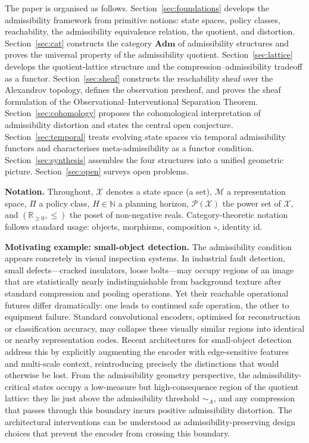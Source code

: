 \documentclass[11pt, a4paper]{article}
\theoremstyle{plain}
\theoremstyle{definition}
\theoremstyle{remark}
\newcommand{\R}{\mathbb{R}}
\newcommand{\N}{\mathbb{N}}
\newcommand{\calX}{\mathcal{X}}
\newcommand{\calM}{\mathcal{M}}
\newcommand{\calP}{\mathcal{P}}
\newcommand{\simA}{\sim_{\!A}}
\newcommand{\Adm}{\mathbf{Adm}}
\newcommand{\id}{\mathrm{id}}
\begin{document}
The paper is organised as follows. Section~\ref{sec:foundations} develops
the admissibility framework from primitive notions: state spaces, policy
classes, reachability, the admissibility equivalence relation, the quotient,
and distortion. Section~\ref{sec:cat} constructs the category $\Adm$ of
admissibility structures and proves the universal property of the admissibility
quotient. Section~\ref{sec:lattice} develops the quotient-lattice structure
and the compression--admissibility tradeoff as a functor.
Section~\ref{sec:sheaf} constructs the reachability sheaf over the Alexandrov
topology, defines the observation presheaf, and proves the sheaf formulation
of the Observational--Interventional Separation Theorem.
Section~\ref{sec:cohomology} proposes the cohomological interpretation of
admissibility distortion and states the central open conjecture.
Section~\ref{sec:temporal} treats evolving state spaces via temporal
admissibility functors and characterises meta-admissibility as a functor
condition. Section~\ref{sec:synthesis} assembles the four structures into a
unified geometric picture. Section~\ref{sec:open} surveys open problems.

\medskip
\noindent\textbf{Notation.} Throughout, $\calX$ denotes a state space (a set),
$\calM$ a representation space, $\Pi$ a policy class, $H \in \N$ a planning
horizon, $\calP(\calX)$ the power set of $\calX$, and $(\R_{\geq 0}, \leq)$
the poset of non-negative reals. Category-theoretic notation follows standard
usage: objects, morphisms, composition $\circ$, identity $\id$.

\medskip
\noindent\textbf{Motivating example: small-object detection.}
The admissibility condition appears concretely in visual inspection systems.
In industrial fault detection, small defects---cracked insulators, loose
bolts---may occupy regions of an image that are statistically nearly
indistinguishable from background texture after standard compression and
pooling operations. Yet their reachable operational futures differ dramatically:
one leads to continued safe operation, the other to equipment failure. Standard
convolutional encoders, optimised for reconstruction or classification accuracy,
may collapse these visually similar regions into identical or nearby
representation codes. Recent architectures for small-object detection address
this by explicitly augmenting the encoder with edge-sensitive features and
multi-scale context, reintroducing precisely the distinctions that would
otherwise be lost. From the admissibility geometry perspective, the
admissibility-critical states occupy a low-measure but high-consequence region
of the quotient lattice: they lie just above the admissibility threshold
$\simA$, and any compression that passes through this boundary incurs
positive admissibility distortion. The architectural interventions can be
understood as admissibility-preserving design choices that prevent the
encoder from crossing this boundary.
\end{document}
